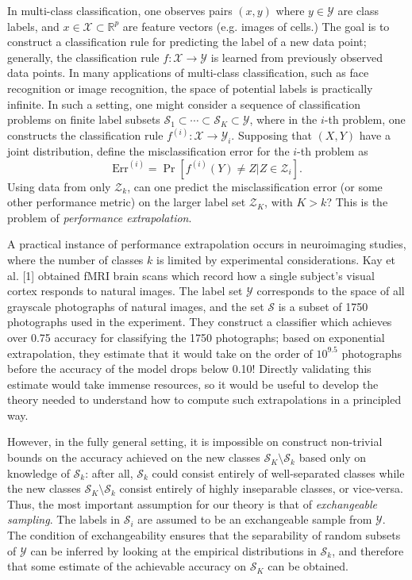 \documentclass[12pt]{article}
\begin{document}
In multi-class classification, one observes pairs $(x, y)$ where
$y \in \mathcal{Y}$ are class labels, and
$x \in \mathcal{X} \subset \mathbb{R}^p$ are feature vectors
(e.g. images of cells.)  The goal is to construct a classification
rule for predicting the label of a new data point; generally, the
classification rule $f: \mathcal{X} \to \mathcal{Y}$ is learned from
previously observed data points.  In many applications of multi-class
classification, such as face recognition or image recognition, the
space of potential labels is practically infinite.  In such a setting,
one might consider a sequence of classification problems on finite
label subsets $\mathcal{S}_1 \subset \cdots \subset \mathcal{S}_K \subset \mathcal{Y}$,
where in the $i$-th problem, one constructs the classification rule
$f^{(i)}:\mathcal{X} \to \mathcal{Y}_i$.  Supposing that $(X, Y)$ have
a joint distribution, define the misclassification error for the $i$-th problem as
\[
\text{Err}^{(i)} = \Pr[f^{(i)}(Y) \neq Z|Z \in \mathcal{Z}_i].
\]
Using data from only $\mathcal{Z}_k$, can one predict the
misclassification error (or some other performance metric) on the
larger label set $\mathcal{Z}_K$, with $K> k$?  This is the problem
of \emph{performance extrapolation}.

A practical instance of performance extrapolation occurs in
neuroimaging studies, where the number of classes $k$ is limited by
experimental considerations.  Kay et al. [1] obtained fMRI brain scans
which record how a single subject's visual cortex responds to natural
images.  The label set $\mathcal{Y}$ corresponds to the space of all
grayscale photographs of natural images, and the set $\mathcal{S}$ is
a subset of 1750 photographs used in the experiment.  They construct a
classifier which achieves over 0.75 accuracy for classifying the 1750
photographs; based on exponential extrapolation, they estimate that it
would take on the order of $10^{9.5}$ photographs before the accuracy
of the model drops below 0.10!  Directly validating this estimate
would take immense resources, so it would be useful to develop the
theory needed to understand how to compute such extrapolations in a
principled way.

However, in the fully general setting, it is impossible on construct
non-trivial bounds on the accuracy achieved on the new classes
$\mathcal{S}_K \setminus \mathcal{S}_k$ based only on knowledge of
$\mathcal{S}_k$: after all, $\mathcal{S}_k$ could consist entirely of
well-separated classes while the new classes
$\mathcal{S}_K \setminus \mathcal{S}_k$ consist entirely of highly
inseparable classes, or vice-versa.  Thus, the most important
assumption for our theory is that of \emph{exchangeable sampling}.
The labels in $\mathcal{S}_i$ are assumed to be an exchangeable sample
from $\mathcal{Y}$.  The condition of exchangeability ensures that the
separability of random subsets of $\mathcal{Y}$ can be inferred by
looking at the empirical distributions in $\mathcal{S}_k$, and
therefore that some estimate of the achievable accuracy on
$\mathcal{S}_K$ can be obtained.
\end{document}
